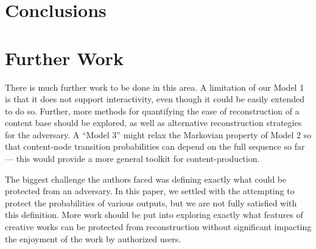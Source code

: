 \documentclass[preprint2]{aastex}
\begin{document}
\section{Conclusions}

\section{Further Work}

There is much further work to be done in this area. A limitation of our Model 1 is that it does not support interactivity, even though it could be easily extended to do so. Further, more methods for quantifying the ease of reconstruction of a content base should be explored, as well as alternative reconstruction strategies for the adversary. A ``Model 3'' might relax the Markovian property of Model 2 so that content-node transition probabilities can depend on the full sequence so far --- this would provide a more general toolkit for content-production.

The biggest challenge the authors faced was defining exactly what could be protected from an adversary. In this paper, we settled with the attempting to protect the probabilities of various outputs, but we are not fully satisfied with this definition. More work should be put into exploring exactly what features of creative works can be protected from reconstruction without significant impacting the enjoyment of the work by authorized users.

\end{document}
